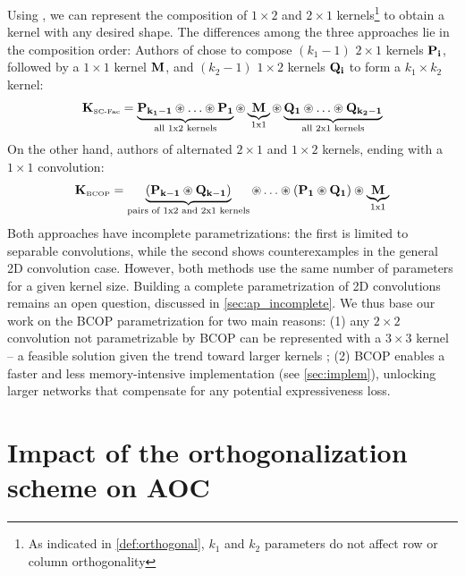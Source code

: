     
    Using \Bconv, we can represent the composition of $1 \times 2$ and $2 \times 1$ kernels\footnote{As indicated in \cref{def:orthogonal}, $k_1$ and $k_2$ parameters do not affect row or column orthogonality} to obtain a kernel with any desired shape. The differences among the three approaches lie in the composition order:  
    Authors of \cite{su_scaling-up_2021} chose to compose $(k_1-1)$ $2 \times 1$ kernels $\mathbf{P_i}$, followed by a $1 \times 1$ kernel $\mathbf{M}$, and $(k_2-1)$ $1 \times 2$ kernels $\mathbf{Q_i}$ to form a $k_1 \times k_2$ kernel:
    \[
        \kernel{K}_{\text{\tiny{SC-Fac}}} = \underbrace{\kernel{P_{k_1-1}} \mathbconv \dots \mathbconv \kernel{P_1}}_{\text{all 1x2 kernels}} \mathbconv \underbrace{\kernel{M}}_{\text{1x1}} \mathbconv \underbrace{\kernel{Q_1} \mathbconv \dots \mathbconv \kernel{Q_{k_2-1}}}_{\text{all 2x1 kernels}}
    \]
    On the other hand, authors of \cite{li_preventing_2019}\cite{xiao_dynamical_2018} alternated $2 \times 1$ and $1 \times 2$ kernels, ending with a $1 \times 1$ convolution:
    \[
        \kernel{K}_{\text{\tiny{BCOP}}} = \underbrace{(\kernel{P_{k-1}} \mathbconv \kernel{Q_{k-1}})}_{\text{pairs of 1x2 and 2x1 kernels}} \mathbconv \dots \mathbconv (\kernel{P_1} \mathbconv \kernel{Q_1}) \mathbconv \underbrace{\kernel{M}}_{\text{1x1}}
    \]
    Both approaches have incomplete parametrizations: the first is limited to separable convolutions, while the second shows counterexamples in the general 2D convolution case. However, both methods use the same number of parameters for a given kernel size. Building a complete parametrization of 2D convolutions remains an open question, discussed in \cref{sec:ap_incomplete}. We thus base our work on the BCOP parametrization \cite{li_preventing_2019} for two main reasons: (1) any $2 \times 2$ convolution not parametrizable by BCOP can be represented with a $3 \times 3$ kernel -- a feasible solution given the trend toward larger kernels \cite{trockman_patches_2022,ding_scaling_2022}; (2) BCOP enables a faster and less memory-intensive implementation (see \cref{sec:implem}), unlocking larger networks that compensate for any potential expressiveness loss.%

\section{Impact of the orthogonalization scheme on AOC}\label{ap:tech_details}

